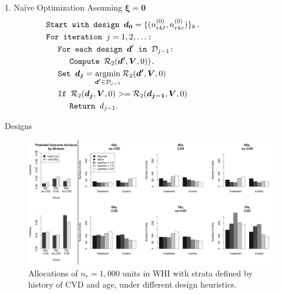 \documentclass[usenames,dvipsnames]{beamer}
\newcommand{\bsxi}{\boldsymbol{\xi}}
\DeclareMathOperator*{\argmin}{argmin}
\theoremstyle{definition} %
\begin{document}
\begin{frame}[allowframebreaks]{1. Na\"ive Optimization Assuming $\bsxi \boldsymbol{= 0}$}
\small
\begin{equation}\label{eq:greedyAlg}
\begin{split}
& \texttt{Start with design $\boldsymbol{d_0} = \{ (n_{rkt}^{(0)}, n_{rkc}^{(0)})\}_k$.} \hspace{25mm} \\
& \texttt{For iteration $j = 1, 2, \dots$:}\\
& \hspace{5mm} \texttt{For each design $\boldsymbol d'$ in $\mathcal{D}_{j-1}$:}\\
& \hspace{10mm} \texttt{Compute $\mathcal{R}_2(\boldsymbol{d'}, \boldsymbol V, 0) )$. } \\
& \hspace{5mm} \texttt{Set $\boldsymbol{d_j} = \argmin_{\boldsymbol{d'} \in \mathcal{D}_{j - 1}} \mathcal{R}_2(\boldsymbol{d'}, \boldsymbol V, 0) $} \\
& \hspace{5mm} \texttt{If $\mathcal{R}_2(\boldsymbol{d_j}, \boldsymbol V, 0)  >=  \mathcal{R}_2(\boldsymbol{d_{j-1}}, \boldsymbol V, 0) $}\\
& \hspace{10mm} \texttt{Return $d_{j - 1}.$}\\
\end{split}
\end{equation}
\end{frame}


\begin{frame}{Designs}
\hspace{-5mm}
\begin{figure}
\centering
\includegraphics[width = 1.05\textwidth]{Allocations.png}
\caption{Allocations of $n_r = 1,000$ units in WHI with strata defined by history of CVD and age, under different design heuristics.}
\end{figure}
\end{frame}
\end{document}
